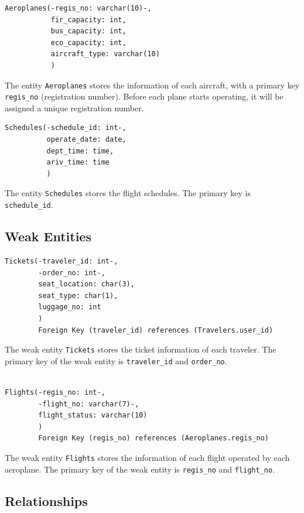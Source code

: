 \documentclass{article}
\begin{document}
	\begin{lstlisting}[keepspaces=true]               
Aeroplanes(-regis_no: varchar(10)-,
           fir_capacity: int,
           bus_capacity: int, 
           eco_capacity: int,
           aircraft_type: varchar(10)
           )
	\end{lstlisting}    
	The entity \texttt{Aeroplanes} stores the information of each aircraft, with a primary key \texttt{regis\_no} (registration number). Before each plane starts operating, it will be assigned a unique registration number.
	
	\begin{lstlisting}[keepspaces=true] 
Schedules(-schedule_id: int-, 
          operate_date: date,
          dept_time: time,
          ariv_time: time
          )
	\end{lstlisting}
	The entity \texttt{Schedules} stores the flight schedules. The primary key is \texttt{schedule\_id}.
	
	\subsection{Weak Entities}
	
	\begin{lstlisting}[keepspaces=true]
Tickets(-traveler_id: int-, 
        -order_no: int-, 
        seat_location: char(3),
        seat_type: char(1),
        luggage_no: int
        )
        Foreign Key (traveler_id) references (Travelers.user_id)
	\end{lstlisting}    
	The weak entity \texttt{Tickets} stores the ticket information of each traveler. The primary key of the weak entity is \texttt{traveler\_id} and \texttt{order\_no}. 

	\begin{lstlisting}[keepspaces=true]        
		
Flights(-regis_no: int-, 
        -flight_no: varchar(7)-,
        flight_status: varchar(10)
        )
        Foreign Key (regis_no) references (Aeroplanes.regis_no)
	\end{lstlisting}
	The weak entity \texttt{Flights} stores the information of each flight operated by each aeroplane. The primary key of the weak entity is \texttt{regis\_no} and \texttt{flight\_no}.

	\subsection{Relationships}
	
\end{document}
